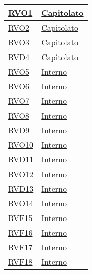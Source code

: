 \begin{longtable}{|>{\centering}m{5cm}|m{5cm}<{\centering}|}
\hyperlink{RVO1}{RVO1} & \hyperlink{Capitolato}{Capitolato}\\ \hline

\hyperlink{RVO2}{RVO2} & \hyperlink{Capitolato}{Capitolato}\\ \hline

\hyperlink{RVO3}{RVO3} & \hyperlink{Capitolato}{Capitolato}\\ \hline

\hyperlink{RVD4}{RVD4} & \hyperlink{Capitolato}{Capitolato}\\ \hline

\hyperlink{RVO5}{RVO5} & \hyperlink{Interno}{Interno}\\ \hline

\hyperlink{RVO6}{RVO6} & \hyperlink{Interno}{Interno}\\ \hline

\hyperlink{RVO7}{RVO7} & \hyperlink{Interno}{Interno}\\ \hline

\hyperlink{RVO8}{RVO8} & \hyperlink{Interno}{Interno}\\ \hline

\hyperlink{RVD9}{RVD9} & \hyperlink{Interno}{Interno}\\ \hline

\hyperlink{RVO10}{RVO10} & \hyperlink{Interno}{Interno}\\ \hline

\hyperlink{RVD11}{RVD11} & \hyperlink{Interno}{Interno}\\ \hline

\hyperlink{RVO12}{RVO12} & \hyperlink{Interno}{Interno}\\ \hline

\hyperlink{RVD13}{RVD13} & \hyperlink{Interno}{Interno}\\ \hline

\hyperlink{RVO14}{RVO14} & \hyperlink{Interno}{Interno}\\ \hline

\hyperlink{RVF15}{RVF15} & \hyperlink{Interno}{Interno}\\ \hline

\hyperlink{RVF16}{RVF16} & \hyperlink{Interno}{Interno}\\ \hline

\hyperlink{RVF17}{RVF17} & \hyperlink{Interno}{Interno}\\ \hline

\hyperlink{RVF18}{RVF18} & \hyperlink{Interno}{Interno}\\ \hline


\end{longtable}
